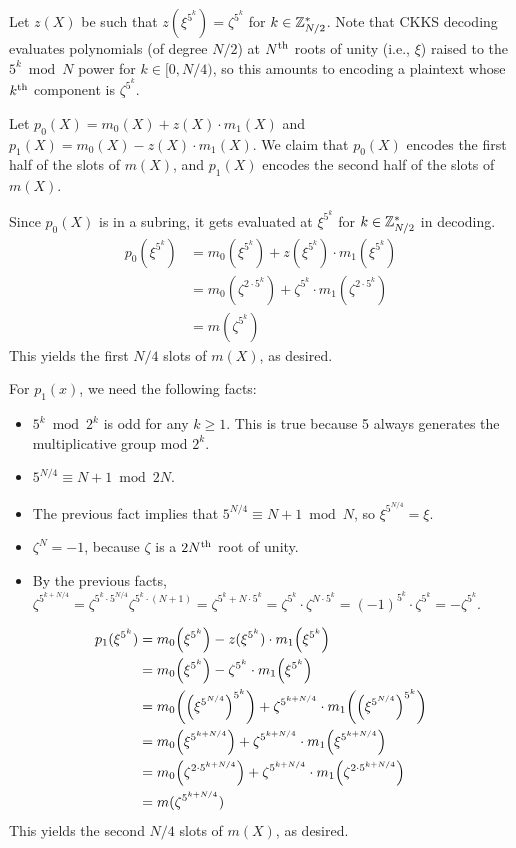 \documentclass[../fheimpl.tex]{subfiles}
\begin{document}
	Let $z(X)$ be such that $z(\xi^{5^k}) = \zeta^{5^k}$ for $k\in\mathbb{Z}_{N/2}^*$. Note that CKKS decoding evaluates polynomials (of degree $N/2$) at $N^{\mathrm{th}}$ roots of unity (i.e., $\xi$) raised to the $5^k \bmod N$ power for $k\in[0, N/4)$, so this amounts to encoding a plaintext whose $k^{\mathrm{th}}$ component is $\zeta^{5^k}$.
	
	Let $p_0(X) = m_0(X) + z(X)\cdot m_1(X)$ and $p_1(X) = m_0(X) - z(X)\cdot m_1(X)$.
	We claim that $p_0(X)$ encodes the first half of the slots of $m(X)$, and $p_1(X)$ encodes the second half of the slots of $m(X)$.
	
	Since $p_0(X)$ is in a subring, it gets evaluated at $\xi^{5^k}$ for $k\in\mathbb{Z}_{N/2}^*$ in decoding. 
	\begin{align}
		p_0(\xi^{5^k}) &= m_0(\xi^{5^k}) + z(\xi^{5^k})\cdot m_1(\xi^{5^k}) \\
		             &= m_0(\zeta^{2\cdot 5^k}) + \zeta^{5^k}\cdot m_1(\zeta^{2\cdot 5^k}) \\
		             &= m(\zeta^{5^k})
	\end{align}
	This yields the first $N/4$ slots of $m(X)$, as desired.
	
	For $p_1(x)$, we need the following facts:
	\begin{itemize}
		\item $5^k\bmod 2^k$ is odd for any $k\ge1$. This is true because 5 always generates the multiplicative group mod $2^k$.
		\item $5^{N/4}\equiv N+1\bmod 2N$.
		\item The previous fact implies that $5^{N/4}\equiv N+1\bmod N$, so $\xi^{5^{N/4}}=\xi$. 
		\item $\zeta^N = -1$, because $\zeta$ is a $2N^{\mathrm{th}}$ root of unity.
		\item By the previous facts, $\zeta^{5^{k+N/4}} = \zeta^{5^k\cdot 5^{N/4}} \zeta^{5^k\cdot (N+1)} = \zeta^{5^k + N\cdot 5^k} = \zeta^{5^k}\cdot \zeta^{N\cdot 5^k} = (-1)^{5^k}\cdot \zeta^{5^k} = -\zeta^{5^k}$.
	\end{itemize}
	
	\begin{align}
		p_1(\xi^{5^k}) &= m_0\parens*{\xi^{5^k}} - z(\xi^{5^k})\cdot m_1\parens*{\xi^{5^k}} \\
		             &= m_0\parens*{\xi^{5^k}} - \zeta^{5^k}\cdot m_1\parens* {\xi^{5^k}} \\
		             &= m_0\parens*{\parens*{\xi^{5^{N/4}}}^{5^k}} + \zeta^{5^{k+N/4}}\cdot m_1\parens*{\parens*{\xi^{5^{N/4}}}^{5^k}} \\
		             &= m_0\parens*{\xi^{5^{k+N/4}}} + \zeta^{5^{k+N/4}}\cdot m_1\parens*{\xi^{5^{k+N/4}}} \label{eqn:3.7}\\
		             &= m_0\parens*{\zeta^{2\cdot 5^{k+N/4}}} + \zeta^{5^{k+N/4}}\cdot m_1\parens*{\zeta^{2\cdot 5^{k+N/4}}} \\
		             &= m(\zeta^{5^{k+N/4}})
	\end{align}
	This yields the second $N/4$ slots of $m(X)$, as desired.
	
\end{document}
